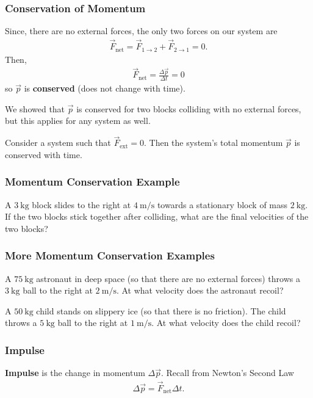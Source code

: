 \documentclass[20pt]{beamer}
\begin{document}
\begin{frame}
	\frametitle{Conservation of Momentum}
	\begin{example}[cont.]
		Since, there are no external forces, the only two forces on our system are
		\begin{align*}
			\vec{F}_\mathrm{net} = \vec{F}_{1 \rightarrow 2} + \vec{F}_{2 \rightarrow 1} = 0.
		\end{align*}
		Then,
		\begin{align*}
			\vec{F}_\mathrm{net} = \frac{\Delta \vec{p}}{\Delta t} = 0
		\end{align*}
		so $\vec{p}$ is \textbf{conserved} (does not change with time).
	\end{example}
	We showed that $\vec{p}$ is conserved for two blocks colliding with no external forces, but this applies for any system as well.
	\begin{theorem}
		Consider a system such that $\vec{F}_\mathrm{ext} = 0$. Then the system's total momentum $\vec{p}$ is conserved with time.
	\end{theorem}
\end{frame}

\begin{frame}
	\frametitle{Momentum Conservation Example}
	\begin{example}
		A $\SI{3}{\kilogram}$ block slides to the right at $\SI{4}{\meter/\second}$ towards a stationary block of mass $\SI{2}{\kilogram}$.
		If the two blocks stick together after colliding, what are the final velocities of the two blocks?
	\end{example}
\end{frame}

\begin{frame}
	\frametitle{More Momentum Conservation Examples}
	\begin{example}
		A $\SI{75}{\kilogram}$ astronaut in deep space (so that there are no external forces) throws a $\SI{3}{\kilogram}$ ball to the right at $\SI{2}{\meter/\second}$. At what velocity does the astronaut recoil?
	\end{example}
	\begin{example}
		A $\SI{50}{\kilogram}$ child stands on slippery ice (so that there is no friction). The child throws a $\SI{5}{\kilogram}$ ball to the right at $\SI{1}{\meter/\second}$. At what velocity does the child recoil?
	\end{example}
\end{frame}

\begin{frame}
	\frametitle{Impulse}
	\begin{definition}
		\textbf{Impulse} is the change in momentum $\Delta \vec{p}$. Recall from Newton's Second Law
		\begin{align*}
			\Delta \vec{p} = \vec{F}_\mathrm{net} \Delta t.
		\end{align*}
	\end{definition}
\end{frame}
\end{document}
